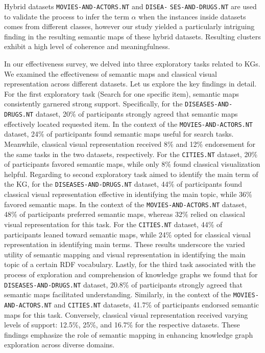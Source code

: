 \documentclass{ieeeaccess}
\begin{document}
Hybrid datasets \texttt{MOVIES-AND-ACTORS.NT} and
\texttt{DISEA-} \texttt{SES-AND-DRUGS.NT} are used to 
validate the process to infer the
term $\alpha$ when the instances inside datasets comes
from different classes, however our study yielded a 
particularly intriguing finding in the
resulting semantic maps of these hybrid datasets.
Resulting clusters exhibit a high level of
coherence and meaningfulness.

In our effectiveness survey, we delved into three 
exploratory tasks related to KGs. We examined the 
effectiveness of semantic maps and classical 
visual representation across different datasets. 
Let us explore the key findings in detail.
For the first exploratory task (Search for one
specific item), semantic maps consistently 
garnered strong support. Specifically, for the \texttt{DISEASES-AND-DRUGS.NT} dataset, 20\% of 
participants strongly agreed that semantic maps 
effectively located requested item. In the context 
of the \texttt{MOVIES-AND-ACTORS.NT} dataset, 24\% 
of participants found semantic maps useful for 
search tasks. Meanwhile, classical visual 
representation received 8\% and 12\% endorsement 
for the same tasks in the two datasets, 
respectively. For the \texttt{CITIES.NT} dataset, 
20\% of participants favored semantic maps, while 
only 8\% found classical visualization helpful.
Regarding to second exploratory task aimed to
identify the main term of the KG, for the 
\texttt{DISEASES-AND-DRUGS.NT} dataset, 44\% of 
participants found classical visual representation
effective in identifying the main topic, while
36\% favored semantic maps. In the context of the
\texttt{MOVIES-AND-ACTORS.NT} dataset, 48\% of 
participants preferred semantic maps, whereas 32\% 
relied on classical visual representation for this 
task. For the \texttt{CITIES.NT} dataset, 44\% of 
participants leaned toward semantic maps, while 
24\% opted for classical visual representation in 
identifying main terms. These results underscore 
the varied utility of semantic mapping and visual 
representation in identifying the main topic of
a certain RDF vocabulary. Lastly, for the third 
task associated with the 
process of exploration and comprehension of 
knowledge graphs we found that for 
\texttt{DISEASES-AND-DRUGS.NT} dataset, 20.8\% of 
participants strongly agreed that semantic maps 
facilitated understanding. Similarly, in the 
context of the \texttt{MOVIES-AND-ACTORS.NT} and 
\texttt{CITIES.NT} datasets, 41.7\% of 
participants endorsed semantic maps for this task.
Conversely, classical visual representation 
received varying levels of support: 12.5\%, 25\%, 
and 16.7\% for the respective datasets. These 
findings emphasize the role of semantic mapping in 
enhancing knowledge graph exploration across 
diverse domains.
\end{document}
